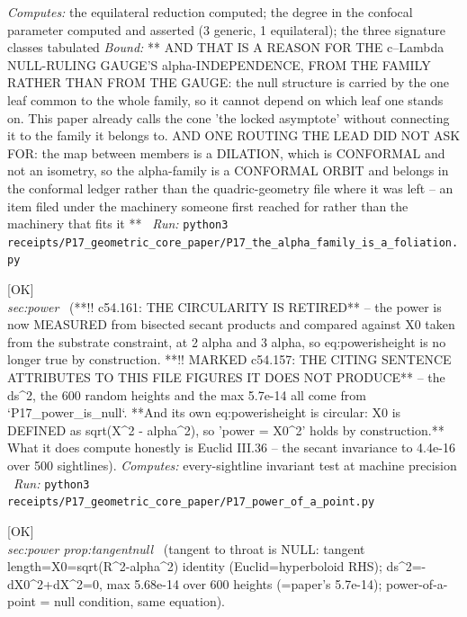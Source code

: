 \begin{description}
\emph{Computes:} the equilateral reduction computed; the degree in the confocal parameter computed and asserted (3 generic, 1 equilateral); the three signature classes tabulated
 \emph{Bound:} ** AND THAT IS A REASON FOR THE c--Lambda NULL-RULING GAUGE'S alpha-INDEPENDENCE, FROM THE FAMILY RATHER THAN FROM THE GAUGE: the null structure is carried by the one leaf common to the whole family, so it cannot depend on which leaf one stands on. This paper already calls the cone 'the locked asymptote' without connecting it to the family it belongs to. AND ONE ROUTING THE LEAD DID NOT ASK FOR: the map between members is a DILATION, which is CONFORMAL and not an isometry, so the alpha-family is a CONFORMAL ORBIT and belongs in the conformal ledger rather than the quadric-geometry file where it was left -- an item filed under the machinery someone first reached for rather than the machinery that fits it **
\ \emph{Run:} \texttt{python3 receipts/P17\_geometric\_core\_paper/P17\_the\_alpha\_family\_is\_a\_foliation.py}
\item[\rcptlabel{P17_power_of_a_point}{P17R4}\textbf{P17R4}\quad\texttt{P17\_power\_of\_a\_point}]\hfill\textsf{[OK]}\\
\textit{sec:power} \ (**!! c54.161: THE CIRCULARITY IS RETIRED** -- the power is now MEASURED from bisected secant products and compared against X0 taken from the substrate constraint, at 2 alpha and 3 alpha, so eq:powerisheight is no longer true by construction. **!! MARKED c54.157: THE CITING SENTENCE ATTRIBUTES TO THIS FILE FIGURES IT DOES NOT PRODUCE** -- the ds\textasciicircum{}2, the 600 random heights and the max 5.7e-14 all come from `P17\_power\_is\_null`. **And its own eq:powerisheight is circular: X0 is DEFINED as sqrt(\textbar{}X\textbar{}\textasciicircum{}2 - alpha\textasciicircum{}2), so 'power = X0\textasciicircum{}2' holds by construction.** What it does compute honestly is Euclid III.36 -- the secant invariance to 4.4e-16 over 500 sightlines). 
\emph{Computes:} every-sightline invariant test at machine precision
\ \emph{Run:} \texttt{python3 receipts/P17\_geometric\_core\_paper/P17\_power\_of\_a\_point.py}
\item[\rcptlabel{P17_power_is_null}{P17R5}\textbf{P17R5}\quad\texttt{P17\_power\_is\_null}]\hfill\textsf{[OK]}\\
\textit{sec:power prop:tangentnull} \ (tangent to throat is NULL: tangent length=\textbar{}X0\textbar{}=sqrt(R\textasciicircum{}2-alpha\textasciicircum{}2) identity (Euclid=hyperboloid RHS); ds\textasciicircum{}2=-dX0\textasciicircum{}2+\textbar{}dX\textbar{}\textasciicircum{}2=0, max 5.68e-14 over 600 heights (=paper's 5.7e-14); power-of-a-point = null condition, same equation). 

\end{description}
